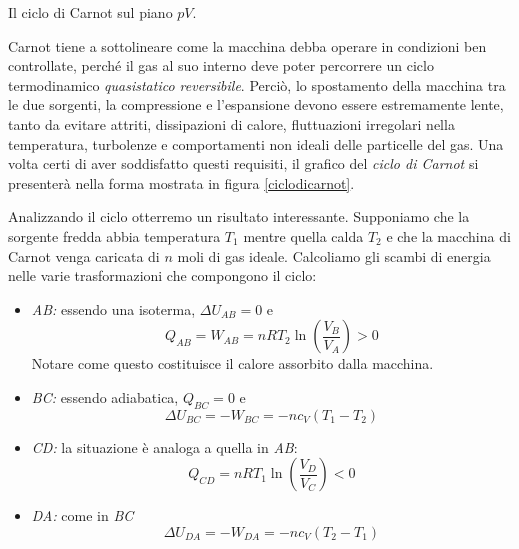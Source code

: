 \begin{marginfigure}
\begin{center}
    \end{center}
    \caption{Il ciclo di Carnot sul piano $pV$.}
    \label{ciclodicarnot}
\end{marginfigure}


Carnot tiene a sottolineare come la macchina debba operare in condizioni
ben controllate, perché il gas al suo interno deve poter percorrere un
ciclo termodinamico \textit{quasistatico reversibile}. Perciò, lo spostamento
della macchina tra le due sorgenti, la compressione e l'espansione devono
essere estremamente lente, tanto da evitare attriti, dissipazioni di
calore, fluttuazioni irregolari nella temperatura,
turbolenze e comportamenti non ideali delle particelle del gas.
Una volta certi di aver soddisfatto questi requisiti, il
grafico del \textit{ciclo di Carnot} si presenterà nella forma mostrata
in figura \ref{ciclodicarnot}.




Analizzando il ciclo otterremo un risultato interessante.
Supponiamo che la sorgente fredda abbia temperatura $T_1$ mentre quella
calda $T_2$ e che la macchina di Carnot venga caricata di $n$ moli
di gas ideale. Calcoliamo gli scambi di energia nelle varie
trasformazioni che compongono il ciclo:

\begin{itemize}
    \item \textit{AB:} essendo una isoterma, $\Delta U_{AB} = 0$ e
    \[ Q_{AB} = W_{AB} = nRT_2\ln\left(\frac{V_B}{V_A}\right) > 0 \]
    Notare come questo costituisce il calore assorbito dalla macchina.

    \item \textit{BC:} essendo adiabatica, $Q_{BC} = 0$ e
    \[ \Delta U_{BC} = -W_{BC} = -nc_V(T_1 - T_2) \]

    \item \textit{CD:} la situazione è analoga a quella in \textit{AB}:
    \[ Q_{CD} = nRT_1\ln\left(\frac{V_D}{V_C}\right) < 0 \]

    \item \textit{DA:} come in \textit{BC}
    \[ \Delta U_{DA} = -W_{DA} = -nc_V(T_2 - T_1) \]
\end{itemize}

